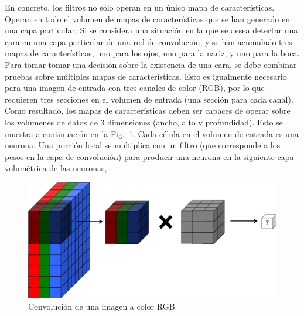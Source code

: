 	En concreto, los filtros no sólo operan en un único mapa de características. Operan en todo el volumen de mapas de características que se han generado en una capa particular. Si se considera una situación en la que se desea detectar una cara en una capa particular de una red de convolución, y se han acumulado tres mapas de características, uno para los ojos, uno para la nariz, y uno para la boca. Para tomar tomar una decisión sobre la existencia de una cara, se debe combinar pruebas sobre múltiples mapas de características. Esto es igualmente necesario para una imagen de entrada con tres canales de color (RGB), por lo que requieren tres secciones en el volumen de entrada (una sección para cada canal). Como resultado, los mapas de características deben ser capaces de operar sobre los volúmenes de datos de 3 dimensiones (ancho, alto y profundidad). Esto se muestra a continuación en la Fig.~\ref{fig:color_conv}. Cada célula en el volumen de entrada es una neurona. Una porción local se multiplica con un filtro (que corresponde a los pesos en la capa de convolución) para producir una neurona en la siguiente capa volumétrica de las neuronas, \cite{dlBook}.
	\begin{figure}[htp]
        \centering
        \includegraphics[scale=0.3]{chapter3/color_conv.png}
        \caption{Convolución de una imagen a color RGB}
        \label{fig:color_conv}
    \end{figure}

